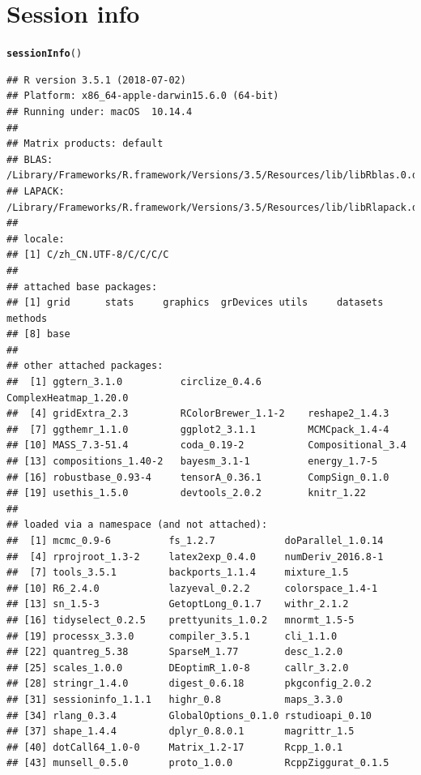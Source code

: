 \documentclass{article}\usepackage[]{graphicx}\usepackage[]{color}
\makeatletter
\newcommand{\hlstd}[1]{\textcolor[rgb]{0.345,0.345,0.345}{#1}}%
\newcommand{\hlkwd}[1]{\textcolor[rgb]{0.737,0.353,0.396}{\textbf{#1}}}%
\newenvironment{kframe}{%
 \def\at@end@of@kframe{}%
 \ifinner\ifhmode%
  \def\at@end@of@kframe{\end{minipage}}%
  \begin{minipage}{\columnwidth}%
 \fi\fi%
 \def\FrameCommand##1{\hskip\@totalleftmargin \hskip-\fboxsep
 \colorbox{shadecolor}{##1}\hskip-\fboxsep
     \hskip-\linewidth \hskip-\@totalleftmargin \hskip\columnwidth}%
 \MakeFramed {\advance\hsize-\width
   \@totalleftmargin\z@ \linewidth\hsize
   \@setminipage}}%
 {\par\unskip\endMakeFramed%
 \at@end@of@kframe}
\newenvironment{knitrout}{}{} %
\makeatother
\begin{document}
\section{Session info}
\begin{knitrout}
\color{fgcolor}\begin{kframe}
\begin{alltt}
  \hlkwd{sessionInfo}\hlstd{()}
\end{alltt}
\begin{verbatim}
## R version 3.5.1 (2018-07-02)
## Platform: x86_64-apple-darwin15.6.0 (64-bit)
## Running under: macOS  10.14.4
## 
## Matrix products: default
## BLAS: /Library/Frameworks/R.framework/Versions/3.5/Resources/lib/libRblas.0.dylib
## LAPACK: /Library/Frameworks/R.framework/Versions/3.5/Resources/lib/libRlapack.dylib
## 
## locale:
## [1] C/zh_CN.UTF-8/C/C/C/C
## 
## attached base packages:
## [1] grid      stats     graphics  grDevices utils     datasets  methods  
## [8] base     
## 
## other attached packages:
##  [1] ggtern_3.1.0          circlize_0.4.6        ComplexHeatmap_1.20.0
##  [4] gridExtra_2.3         RColorBrewer_1.1-2    reshape2_1.4.3       
##  [7] ggthemr_1.1.0         ggplot2_3.1.1         MCMCpack_1.4-4       
## [10] MASS_7.3-51.4         coda_0.19-2           Compositional_3.4    
## [13] compositions_1.40-2   bayesm_3.1-1          energy_1.7-5         
## [16] robustbase_0.93-4     tensorA_0.36.1        CompSign_0.1.0       
## [19] usethis_1.5.0         devtools_2.0.2        knitr_1.22           
## 
## loaded via a namespace (and not attached):
##  [1] mcmc_0.9-6          fs_1.2.7            doParallel_1.0.14  
##  [4] rprojroot_1.3-2     latex2exp_0.4.0     numDeriv_2016.8-1  
##  [7] tools_3.5.1         backports_1.1.4     mixture_1.5        
## [10] R6_2.4.0            lazyeval_0.2.2      colorspace_1.4-1   
## [13] sn_1.5-3            GetoptLong_0.1.7    withr_2.1.2        
## [16] tidyselect_0.2.5    prettyunits_1.0.2   mnormt_1.5-5       
## [19] processx_3.3.0      compiler_3.5.1      cli_1.1.0          
## [22] quantreg_5.38       SparseM_1.77        desc_1.2.0         
## [25] scales_1.0.0        DEoptimR_1.0-8      callr_3.2.0        
## [28] stringr_1.4.0       digest_0.6.18       pkgconfig_2.0.2    
## [31] sessioninfo_1.1.1   highr_0.8           maps_3.3.0         
## [34] rlang_0.3.4         GlobalOptions_0.1.0 rstudioapi_0.10    
## [37] shape_1.4.4         dplyr_0.8.0.1       magrittr_1.5       
## [40] dotCall64_1.0-0     Matrix_1.2-17       Rcpp_1.0.1         
## [43] munsell_0.5.0       proto_1.0.0         RcppZiggurat_0.1.5 

\end{verbatim}
\end{kframe}
\end{knitrout}
\end{document}
